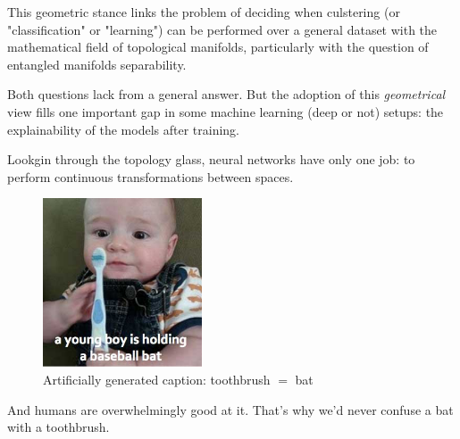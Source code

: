 This geometric stance links the problem of deciding when culstering (or 
"classification" or "learning") can be performed over a general dataset with 
the mathematical field of topological manifolds, particularly with the question 
of entangled manifolds separability.\cite{topology}

Both questions lack from a general answer. But the adoption of this \textit{
geometrical} view fills one important gap in some machine learning (deep or not) 
setups: the explainability of the models after training.

Lookgin through the topology glass, neural networks have only one job: to perform 
continuous transformations between spaces. 

	\begin{figure}[h!]
\begin{center}
		\includegraphics[height=5cm]{images/baby.jpg} %
		\caption{Artificially generated caption: toothbrush $=$ bat} %
		\label{baby} %
\end{center}
	\end{figure}

And humans are overwhelmingly good at it. That's why we'd never confuse a bat 
with a toothbrush.  
